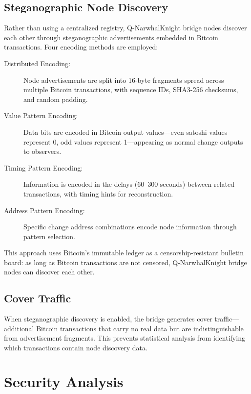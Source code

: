 \documentclass[11pt,a4paper]{article}
\begin{document}
\subsection{Steganographic Node Discovery}

Rather than using a centralized registry, Q-NarwhalKnight bridge nodes discover each other through steganographic advertisements embedded in Bitcoin transactions. Four encoding methods are employed:

\begin{description}
    \item[Distributed Encoding:] Node advertisements are split into 16-byte fragments spread across multiple Bitcoin transactions, with sequence IDs, SHA3-256 checksums, and random padding.
    \item[Value Pattern Encoding:] Data bits are encoded in Bitcoin output values---even satoshi values represent 0, odd values represent 1---appearing as normal change outputs to observers.
    \item[Timing Pattern Encoding:] Information is encoded in the delays (60--300 seconds) between related transactions, with timing hints for reconstruction.
    \item[Address Pattern Encoding:] Specific change address combinations encode node information through pattern selection.
\end{description}

This approach uses Bitcoin's immutable ledger as a censorship-resistant bulletin board: as long as Bitcoin transactions are not censored, Q-NarwhalKnight bridge nodes can discover each other.

\subsection{Cover Traffic}

When steganographic discovery is enabled, the bridge generates cover traffic---additional Bitcoin transactions that carry no real data but are indistinguishable from advertisement fragments. This prevents statistical analysis from identifying which transactions contain node discovery data.

\section{Security Analysis}
\label{sec:security}
\end{document}
